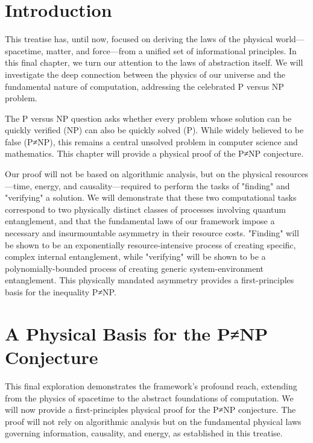 \documentclass[11pt, letterpaper]{report}
\theoremstyle{plain} %
\theoremstyle{definition} %
\theoremstyle{remark} %
\begin{document}
\section{Introduction}

This treatise has, until now, focused on deriving the laws of the physical world—spacetime, matter, and force—from a unified set of informational principles. In this final chapter, we turn our attention to the laws of abstraction itself. We will investigate the deep connection between the physics of our universe and the fundamental nature of computation, addressing the celebrated P versus NP problem.

The P versus NP question asks whether every problem whose solution can be quickly verified (NP) can also be quickly solved (P). While widely believed to be false (P≠NP), this remains a central unsolved problem in computer science and mathematics. This chapter will provide a physical proof of the P≠NP conjecture.

Our proof will not be based on algorithmic analysis, but on the physical resources—time, energy, and causality—required to perform the tasks of "finding" and "verifying" a solution. We will demonstrate that these two computational tasks correspond to two physically distinct classes of processes involving quantum entanglement, and that the fundamental laws of our framework impose a necessary and insurmountable asymmetry in their resource costs. "Finding" will be shown to be an exponentially resource-intensive process of creating specific, complex internal entanglement, while "verifying" will be shown to be a polynomially-bounded process of creating generic system-environment entanglement. This physically mandated asymmetry provides a first-principles basis for the inequality P≠NP.









\section{A Physical Basis for the P≠NP Conjecture}
\label{sec:pnp_proof}

This final exploration demonstrates the framework's profound reach, extending from the physics of spacetime to the abstract foundations of computation. We will now provide a first-principles physical proof for the P≠NP conjecture. The proof will not rely on algorithmic analysis but on the fundamental physical laws governing information, causality, and energy, as established in this treatise.
\end{document}

